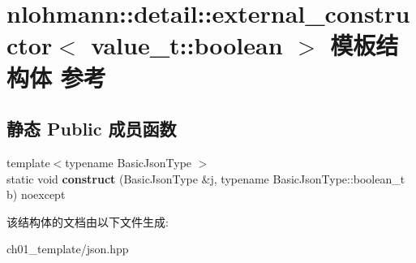 \hypertarget{structnlohmann_1_1detail_1_1external__constructor_3_01value__t_1_1boolean_01_4}{}\section{nlohmann\+::detail\+::external\+\_\+constructor$<$ value\+\_\+t\+::boolean $>$ 模板结构体 参考}
\label{structnlohmann_1_1detail_1_1external__constructor_3_01value__t_1_1boolean_01_4}
\subsection*{静态 Public 成员函数}
\begin{DoxyCompactItemize}
\item 
\mbox{\label{structnlohmann_1_1detail_1_1external__constructor_3_01value__t_1_1boolean_01_4_a867122bcf0856c757bd6bcbfb8be74bc}} 
{\footnotesize template$<$typename Basic\+Json\+Type $>$ }\\static void {\bfseries construct} (Basic\+Json\+Type \&j, typename Basic\+Json\+Type\+::boolean\+\_\+t b) noexcept
\end{DoxyCompactItemize}


该结构体的文档由以下文件生成\+:\begin{DoxyCompactItemize}
\item 
ch01\+\_\+template/json.\+hpp\end{DoxyCompactItemize}
